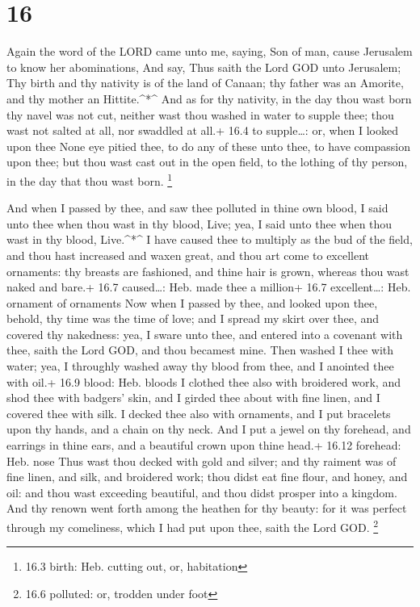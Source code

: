\hypertarget{section-15}{%
\section{16}\label{section-15}}

 Again the word of the LORD came unto me, saying,
 Son of man, cause Jerusalem to know her abominations,
 And say, Thus saith the Lord GOD unto Jerusalem; Thy birth
and thy nativity is of the land of Canaan; thy father was an Amorite,
and thy mother an Hittite.\^{}*\^{}  And as for thy
nativity, in the day thou wast born thy navel was not cut, neither wast
thou washed in water to supple thee; thou wast not salted at all, nor
swaddled at all.+ 16.4 to supple\ldots: or, when I looked upon thee
 None eye pitied thee, to do any of these unto thee, to have
compassion upon thee; but thou wast cast out in the open field, to the
lothing of thy person, in the day that thou wast born. \footnote{16.3
  birth: Heb. cutting out, or, habitation}

 And when I passed by thee, and saw thee polluted in thine
own blood, I said unto thee when thou wast in thy blood, Live; yea, I
said unto thee when thou wast in thy blood, Live.\^{}*\^{} 
I have caused thee to multiply as the bud of the field, and thou hast
increased and waxen great, and thou art come to excellent ornaments: thy
breasts are fashioned, and thine hair is grown, whereas thou wast naked
and bare.+ 16.7 caused\ldots: Heb. made thee a million+ 16.7
excellent\ldots: Heb. ornament of ornaments  Now when I
passed by thee, and looked upon thee, behold, thy time was the time of
love; and I spread my skirt over thee, and covered thy nakedness: yea, I
sware unto thee, and entered into a covenant with thee, saith the Lord
GOD, and thou becamest mine.  Then washed I thee with water;
yea, I throughly washed away thy blood from thee, and I anointed thee
with oil.+ 16.9 blood: Heb. bloods  I clothed thee also
with broidered work, and shod thee with badgers' skin, and I girded thee
about with fine linen, and I covered thee with silk.  I
decked thee also with ornaments, and I put bracelets upon thy hands, and
a chain on thy neck.  And I put a jewel on thy forehead,
and earrings in thine ears, and a beautiful crown upon thine head.+
16.12 forehead: Heb. nose  Thus wast thou decked with gold
and silver; and thy raiment was of fine linen, and silk, and broidered
work; thou didst eat fine flour, and honey, and oil: and thou wast
exceeding beautiful, and thou didst prosper into a kingdom.
 And thy renown went forth among the heathen for thy
beauty: for it was perfect through my comeliness, which I had put upon
thee, saith the Lord GOD. \footnote{16.6 polluted: or, trodden under
  foot}

